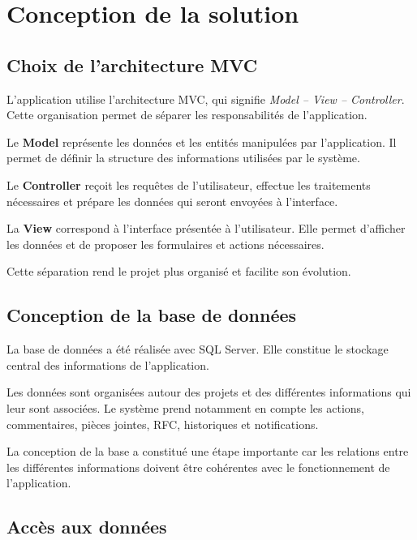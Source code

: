 \documentclass[12pt,a4paper,oneside]{report}
\begin{document}
\chapter{Conception de la solution}

\section{Choix de l'architecture MVC}

L'application utilise l'architecture MVC, qui signifie \textit{Model -- View -- Controller}. Cette organisation permet de séparer les responsabilités de l'application.

Le \textbf{Model} représente les données et les entités manipulées par l'application. Il permet de définir la structure des informations utilisées par le système.

Le \textbf{Controller} reçoit les requêtes de l'utilisateur, effectue les traitements nécessaires et prépare les données qui seront envoyées à l'interface.

La \textbf{View} correspond à l'interface présentée à l'utilisateur. Elle permet d'afficher les données et de proposer les formulaires et actions nécessaires.

Cette séparation rend le projet plus organisé et facilite son évolution.

\section{Conception de la base de données}

La base de données a été réalisée avec SQL Server. Elle constitue le stockage central des informations de l'application.

Les données sont organisées autour des projets et des différentes informations qui leur sont associées. Le système prend notamment en compte les actions, commentaires, pièces jointes, RFC, historiques et notifications.

La conception de la base a constitué une étape importante car les relations entre les différentes informations doivent être cohérentes avec le fonctionnement de l'application.

\section{Accès aux données}
\end{document}
